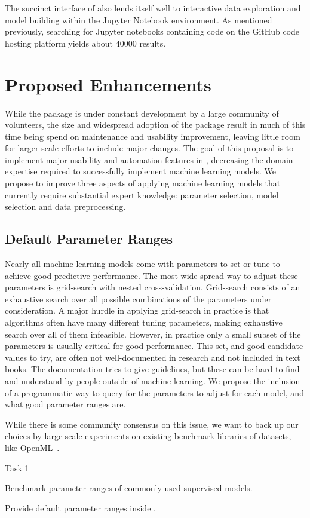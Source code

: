 The succinct interface of \sklearn{} also lends itself well to interactive
data exploration and model building within the Jupyter Notebook environment.
As mentioned previously, searching for Jupyter notebooks containing
\sklearn{} code on the GitHub code hosting platform yields about 40000
results.

\section{Proposed Enhancements}
While the \sklearn{} package is under constant development by a large community
of volunteers, the size and widespread adoption of the package result in much of this
time being spend on maintenance and usability improvement, leaving little room
for larger scale efforts to include major changes. The goal of this proposal
is to implement major usability and automation features in \sklearn{}, decreasing
the domain expertise required to successfully implement machine learning models.
We propose to improve three aspects of applying machine learning models that
currently require substantial expert knowledge: parameter selection, model
selection and data preprocessing.

\subsection{Default Parameter Ranges}
Nearly all machine learning models come with parameters to set or tune
to achieve good predictive performance. The most wide-spread way to adjust
these parameters is grid-search with nested cross-validation.
Grid-search consists of an exhaustive search over all possible combinations
of the parameters under consideration.
A major hurdle in applying grid-search in practice is that algorithms
often have many different tuning parameters, making exhaustive search
over all of them infeasible. However, in practice only a small subset
of the parameters is usually critical for good performance. This set,
and good candidate values to try, are often not well-documented in research and
not included in text books.
The \sklearn{} documentation tries to give guidelines, but these can be hard
to find and understand by people outside of machine learning.
We propose the inclusion of a programmatic way to query for the parameters
to adjust for each model, and what good parameter ranges are.

While there is some community consensus on this issue, we want to back
up our choices by large scale experiments on existing benchmark libraries
of datasets, like OpenML~\autocite{van2013openml}.
\begin{labeling}{Task 1}
    \item [Task 1] Benchmark parameter ranges of commonly used supervised models.
    \item [Task 2] Provide default parameter ranges inside \sklearn{}.
\end{labeling}

